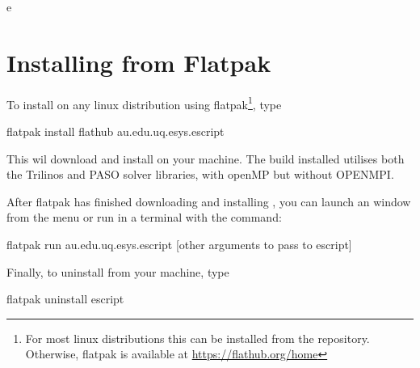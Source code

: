 e%
%
%
%


\chapter{Installing from Flatpak}\label{chap:flatpak}

To install \escript on any linux distribution using flatpak\footnote{For most linux distributions this can be installed from the repository. Otherwise, flatpak is available at \url{https://flathub.org/home}}, type
\begin{shellCode}
flatpak install flathub au.edu.uq.esys.escript
\end{shellCode}

This wil download and install \escript on your machine. The \escript build installed utilises both the Trilinos and PASO solver libraries, with openMP but without OPENMPI. 

After flatpak has finished downloading and installing \escript, you can launch an \escript window from the menu or run \escript in a terminal with the command:
\begin{shellCode}
flatpak run au.edu.uq.esys.escript [other arguments to pass to escript]
\end{shellCode}

Finally, to uninstall \escript from your machine, type
\begin{shellCode}
flatpak uninstall escript
\end{shellCode}
